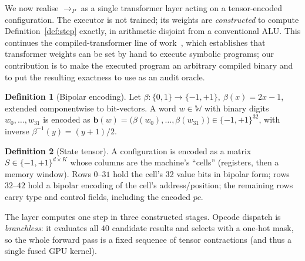 \documentclass[11pt]{article}
\theoremstyle{definition}
\newtheorem{definition}{Definition}
\theoremstyle{plain}
\theoremstyle{remark}
\newcommand{\Word}{\mathbb{W}}
\newcommand{\step}{\longrightarrow}
\newcommand{\bp}{\{-1,+1\}}
\begin{document}
We now realise $\step_P$ as a single transformer layer acting on a tensor-encoded configuration. The
executor is not trained; its weights are \emph{constructed} to compute Definition~\ref{def:step}
exactly, in arithmetic disjoint from a conventional ALU. This continues the compiled-transformer line
of work~\cite{weiss2021,lindner2023,giannou2023}, which establishes that transformer weights can be set
by hand to execute symbolic programs; our contribution is to make the executed program an arbitrary
compiled binary and to put the resulting exactness to use as an audit oracle.

\begin{definition}[Bipolar encoding]
Let $\beta : \{0,1\} \to \bp,\ \beta(x) = 2x-1$, extended componentwise to bit-vectors. A word
$w\in\Word$ with binary digits $w_0,\dots,w_{31}$ is encoded as
$\mathbf{b}(w) = \big(\beta(w_0),\dots,\beta(w_{31})\big) \in \bp^{32}$, with inverse
$\beta^{-1}(y) = (y{+}1)/2$.
\end{definition}

\begin{definition}[State tensor]
A configuration is encoded as a matrix $S \in \bp^{d \times K}$ whose columns are the machine's
``cells'' (registers, then a memory window). Rows $0\text{--}31$ hold the cell's 32 value bits in
bipolar form; rows $32\text{--}42$ hold a bipolar encoding of the cell's address/position; the
remaining rows carry type and control fields, including the encoded $pc$.
\end{definition}

The layer computes one step in three constructed stages. Opcode dispatch is \emph{branchless}: it
evaluates all $40$ candidate results and selects with a one-hot mask, so the whole forward pass is a
fixed sequence of tensor contractions (and thus a single fused GPU kernel).
\end{document}
